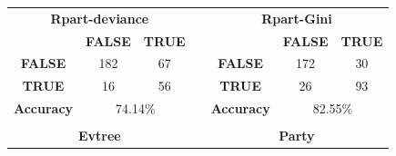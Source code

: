 \begin{frame}
\begin{center}
\begin{table}[]
{\begin{tabular}{ccclccc}
					\multicolumn{3}{|c|}{\textbf{Rpart-deviance}}                                                                                                                         & \multicolumn{1}{l|}{} & \multicolumn{3}{c|}{\textbf{Rpart-Gini}}                                                                                                                             \\ \cline{1-3} \cline{5-7} 
					\multicolumn{1}{|c}{\cellcolor[HTML]{333333}}                   & \cellcolor[HTML]{C0C0C0}\textbf{FALSE} & \multicolumn{1}{c|}{\cellcolor[HTML]{C0C0C0}\textbf{TRUE}} & \multicolumn{1}{l|}{} & \cellcolor[HTML]{333333}                                       & \cellcolor[HTML]{C0C0C0}\textbf{FALSE} & \multicolumn{1}{c|}{\cellcolor[HTML]{C0C0C0}\textbf{TRUE}} \\ \cline{1-3} \cline{5-7} 
					\multicolumn{1}{|c|}{\cellcolor[HTML]{C0C0C0}\textbf{FALSE}}    & \cellcolor[HTML]{32CB00}182            & \multicolumn{1}{c|}{\cellcolor[HTML]{F56B00}67}            & \multicolumn{1}{l|}{} & \multicolumn{1}{c|}{\cellcolor[HTML]{C0C0C0}\textbf{FALSE}}    & \cellcolor[HTML]{32CB00}172            & \multicolumn{1}{c|}{\cellcolor[HTML]{F56B00}30}            \\
					\multicolumn{1}{|c|}{\cellcolor[HTML]{C0C0C0}\textbf{TRUE}}     & \cellcolor[HTML]{F56B00}16             & \multicolumn{1}{c|}{\cellcolor[HTML]{32CB00}56}            & \multicolumn{1}{l|}{} & \multicolumn{1}{c|}{\cellcolor[HTML]{C0C0C0}\textbf{TRUE}}     & \cellcolor[HTML]{F56B00}26             & \multicolumn{1}{c|}{\cellcolor[HTML]{32CB00}93}            \\
					\multicolumn{1}{|c|}{\cellcolor[HTML]{C0C0C0}\textbf{Accuracy}} & \multicolumn{2}{c|}{\cellcolor[HTML]{34CDF9}74.14\%}                                                & \multicolumn{1}{l|}{} & \multicolumn{1}{c|}{\cellcolor[HTML]{C0C0C0}\textbf{Accuracy}} & \multicolumn{2}{c|}{\cellcolor[HTML]{34CDF9}82.55\%}                                                \\ \cline{1-3} \cline{5-7} 
					\multicolumn{1}{l}{}                                            & \multicolumn{1}{l}{}                   & \multicolumn{1}{l}{}                                       &                       & \multicolumn{1}{l}{}                                           & \multicolumn{1}{l}{}                   & \multicolumn{1}{l}{}                                       \\ \cline{1-3} \cline{5-7} 
					\multicolumn{3}{|c|}{\textbf{Evtree}}                                                                                                                                 & \multicolumn{1}{c|}{} & \multicolumn{3}{c|}{\textbf{Party}}                                                                                                                                  \\ \cline{1-3} \cline{5-7} 

\end{tabular}}
\end{table}
\end{center}
\end{frame}
